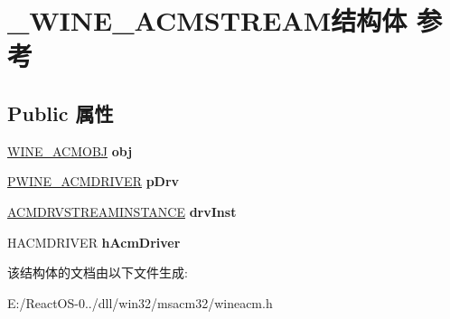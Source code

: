 \hypertarget{struct___w_i_n_e___a_c_m_s_t_r_e_a_m}{}\section{\+\_\+\+W\+I\+N\+E\+\_\+\+A\+C\+M\+S\+T\+R\+E\+A\+M结构体 参考}
\label{struct___w_i_n_e___a_c_m_s_t_r_e_a_m}
\subsection*{Public 属性}
\begin{DoxyCompactItemize}
\item 
\mbox{\label{struct___w_i_n_e___a_c_m_s_t_r_e_a_m_a6ea2b8a4741df2bd234f11fb30318cb8}} 
\hyperlink{struct___w_i_n_e___a_c_m_o_b_j}{W\+I\+N\+E\+\_\+\+A\+C\+M\+O\+BJ} {\bfseries obj}
\item 
\mbox{\label{struct___w_i_n_e___a_c_m_s_t_r_e_a_m_a4dcfb31ae868aa1cc39499045d99485d}} 
\hyperlink{struct___w_i_n_e___a_c_m_d_r_i_v_e_r}{P\+W\+I\+N\+E\+\_\+\+A\+C\+M\+D\+R\+I\+V\+ER} {\bfseries p\+Drv}
\item 
\mbox{\label{struct___w_i_n_e___a_c_m_s_t_r_e_a_m_a710be477359237701be7090b4bea2ce7}} 
\hyperlink{struct___a_c_m_d_r_v_s_t_r_e_a_m_i_n_s_t_a_n_c_e}{A\+C\+M\+D\+R\+V\+S\+T\+R\+E\+A\+M\+I\+N\+S\+T\+A\+N\+CE} {\bfseries drv\+Inst}
\item 
\mbox{\label{struct___w_i_n_e___a_c_m_s_t_r_e_a_m_a7e50765293d56820fddeed38cea84a7b}} 
H\+A\+C\+M\+D\+R\+I\+V\+ER {\bfseries h\+Acm\+Driver}
\end{DoxyCompactItemize}


该结构体的文档由以下文件生成\+:\begin{DoxyCompactItemize}
\item 
E\+:/\+React\+O\+S-\/0../dll/win32/msacm32/wineacm.\+h\end{DoxyCompactItemize}
